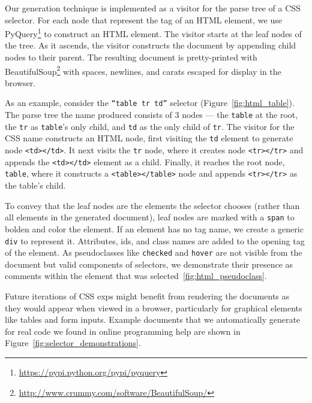 Our generation technique is implemented as a visitor for the parse tree of a CSS selector.
For each node that represent the tag of an HTML element, we use PyQuery\footnote{\url{https://pypi.python.org/pypi/pyquery}} to construct an HTML element.
The visitor starts at the leaf nodes of the tree.
As it ascends, the visitor constructs the document by appending child nodes to their parent.
The resulting document is pretty-printed with BeautifulSoup\footnote{\url{http://www.crummy.com/software/BeautifulSoup/}} with spaces, newlines, and carats escaped for display in the browser.

As an example, consider the \texttt{``table tr td''} selector (Figure~\ref{fig:html_table}).
The parse tree the \gls{name} produced consists of 3 nodes --- the \texttt{table} at the root, the \texttt{tr} as \texttt{table}'s only child, and \texttt{td} as the only child of \texttt{tr}.
The visitor for the CSS \gls{name} constructs an HTML node, first visiting the \texttt{td} element to generate node \texttt{<td></td>}.
It next visits the \texttt{tr} node, where it creates node \texttt{<tr></tr>} and appends the \texttt{<td></td>} element as a child.
Finally, it reaches the root node, \texttt{table}, where it constructs a \texttt{<table></table>} node and appends \texttt{<tr></tr>} as the table's child.
\fi

To convey that the leaf nodes are the elements the selector chooses (rather than all elements in the generated document), leaf nodes are marked with a \texttt{span} to bolden and color the element.
If an element has no tag name, we create a generic \texttt{div} to represent it.
Attributes, ids, and class names are added to the opening tag of the element.
As pseudoclasses like \texttt{checked} and \texttt{hover} are not visible from the document but valid components of selectors, we demonstrate their presence as comments within the element that was selected~\ref{fig:html_pseudoclass}.

Future iterations of CSS \glspl{exp} might benefit from rendering the documents as they would appear when viewed in a browser, particularly for graphical elements like tables and form inputs.
Example documents that we automatically generate for real code we found in online programming help are shown in Figure~\ref{fig:selector_demonstrations}.
\fi
{}
\fi


